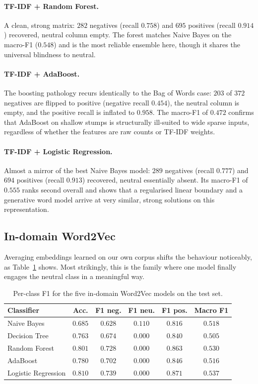 \documentclass[11pt,a4paper]{article}
\begin{document}
\paragraph{TF-IDF + Random Forest.} A clean, strong matrix: $282$ negatives (recall $0.758$)
and $695$ positives (recall $0.914$) recovered, neutral column empty. The forest matches
Naive Bayes on the macro-F1 ($0.548$) and is the most reliable ensemble here, though it
shares the universal blindness to neutral.

\paragraph{TF-IDF + AdaBoost.} The boosting pathology recurs identically to the Bag of Words
case: $203$ of $372$ negatives are flipped to positive (negative recall $0.454$), the
neutral column is empty, and the positive recall is inflated to $0.958$. The macro-F1 of
$0.472$ confirms that AdaBoost on shallow stumps is structurally ill-suited to wide sparse
inputs, regardless of whether the features are raw counts or TF-IDF weights.

\paragraph{TF-IDF + Logistic Regression.} Almost a mirror of the best Naive Bayes model:
$289$ negatives (recall $0.777$) and $694$ positives (recall $0.913$) recovered, neutral
essentially absent. Its macro-F1 of $0.555$ ranks second overall and shows that a
regularised linear boundary and a generative word model arrive at very similar, strong
solutions on this representation.

\subsection{In-domain Word2Vec}
Averaging embeddings learned on our own corpus shifts the behaviour noticeably, as
Table~\ref{tab:w2v} shows. Most strikingly, this is the family where one model finally
engages the neutral class in a meaningful way.

\begin{table}[H]
\centering
\begin{tabular}{lccccc}
\toprule
\textbf{Classifier} & \textbf{Acc.} & \textbf{F1 neg.} & \textbf{F1 neu.} & \textbf{F1 pos.} & \textbf{Macro F1} \\
\midrule
Naive Bayes & $0.685$ & $0.628$ & $\mathbf{0.110}$ & $0.816$ & $0.518$ \\
Decision Tree & $0.763$ & $0.674$ & $0.000$ & $0.840$ & $0.505$ \\
Random Forest & $0.801$ & $0.728$ & $0.000$ & $0.863$ & $0.530$ \\
AdaBoost & $0.780$ & $0.702$ & $0.000$ & $0.846$ & $0.516$ \\
Logistic Regression & $0.810$ & $0.739$ & $0.000$ & $0.871$ & $0.537$ \\
\bottomrule
\end{tabular}
\caption{Per-class F1 for the five in-domain Word2Vec models on the test set.}
\label{tab:w2v}
\end{table}
\end{document}
